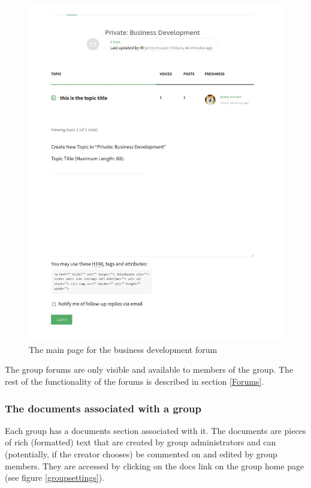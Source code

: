 \documentclass[10pt]{article}
\begin{document}
\begin{figure}[H]
    \centering
    \includegraphics[scale=0.35]{images/forummain.jpg}
    \caption{The main page for the business development forum}
    \label{forummain}
\end{figure}

\begin{flushleft}
The group forums are only visible and available to members of the group.  The rest of the functionality of the forums is described in section \ref{Forums}.
\end{flushleft}


\subsubsection{The documents associated with a group}

\begin{flushleft}
Each group has a documents section associated with it.  The documents are pieces of rich (formatted) text that are created by group administrators and can (potentially, if the creator chooses) be commented on and edited by group members.  They are accessed by clicking on the docs link on the group home page (see figure \ref{groupsettings}).
\end{flushleft}
\end{document}
